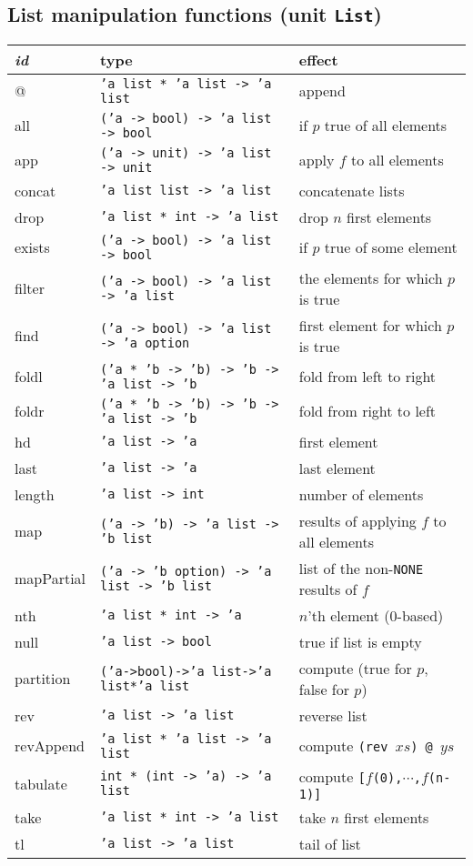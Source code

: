 \documentclass[fleqn]{article}
\begin{document}
\subsection*{List manipulation functions (unit {\tt List})}

\begin{tabular}{@{\tt\ \ }lll}\hline
{\it id\/}  &  type &     effect \\\hline
@           & {\tt 'a list * 'a list -> 'a list} 
        &    append\\
all         & {\tt ('a -> bool) -> 'a list -> bool} 
        & if $p$ true of all elements\\
app         & {\tt ('a -> unit) -> 'a list -> unit} 
        & apply $f$ to all elements\\
concat      & {\tt 'a list list -> 'a list} 
        & concatenate lists\\
drop    & {\tt 'a list * int -> 'a list}
        & drop $n$ first elements\\
exists      & {\tt ('a -> bool) -> 'a list -> bool} 
        & if $p$ true of some element\\
filter      & {\tt ('a -> bool) -> 'a list -> 'a list}
        & the elements for which $p$ is true\\
find        & {\tt ('a -> bool) -> 'a list -> 'a option} 
        & first element for which $p$ is true\\
foldl       & {\tt ('a * 'b -> 'b) -> 'b -> 'a list -> 'b}
        & fold from left to right\\
foldr       & {\tt ('a * 'b -> 'b) -> 'b -> 'a list -> 'b}
        & fold from right to left\\
hd          & {\tt 'a list -> 'a}
        & first element\\
last        & {\tt 'a list -> 'a}
        & last element\\
length      & {\tt 'a list -> int}
        & number of elements\\
map         & {\tt ('a -> 'b) -> 'a list -> 'b list}
        & results of applying $f$ to all elements\\
mapPartial  & {\tt ('a -> 'b option) -> 'a list -> 'b list} 
        & list of the non-{\tt NONE} results of $f$\\
nth         & {\tt 'a list * int -> 'a}
        & $n$'th element (0-based)\\
null        & {\tt 'a list -> bool}
        & true if list is empty\\
partition   & {\tt ('a->bool)->'a list->'a list*'a list}
        &  compute (true for $p$, false for $p$)\\
rev         & {\tt 'a list -> 'a list}
        & reverse list\\
revAppend   & {\tt 'a list * 'a list -> 'a list}
        & compute {\tt (rev $xs$) @ $ys$}\\ 
tabulate    & {\tt int * (int -> 'a) -> 'a list}
        & compute {\tt [$f$(0),$\cdots$,$f$(n-1)]}\\
take    & {\tt 'a list * int -> 'a list}
        & take $n$ first elements\\
tl          & {\tt 'a list -> 'a list}
        & tail of list\\\hline
\end{tabular}
\end{document}
